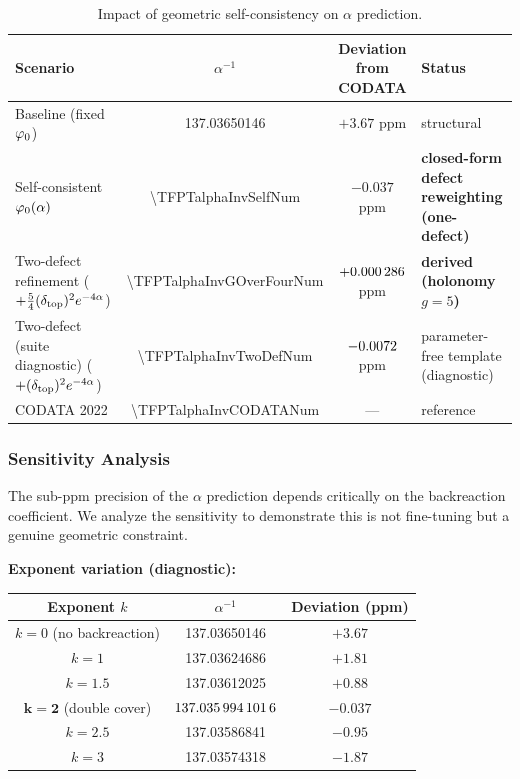 \begin{table}[H]
\centering
\small
\setlength{\tabcolsep}{4pt}
\begin{tabularx}{\linewidth}{@{}lccX@{}}
\toprule
\textbf{Scenario} & $\alpha^{-1}$ & \textbf{Deviation from CODATA} & \textbf{Status}\\
\midrule
Baseline (fixed $\varphi_0$) & 137.03650146 & $+3.67$ ppm & structural\\
Self-consistent $\varphi_0(\alpha)$ & \num[round-mode=places,round-precision=10]{\TFPTalphaInvSelfNum} & $-0.037$ ppm & \textbf{closed-form defect reweighting (one-defect)}\\
Two-defect refinement ($+\tfrac54(\delta_{\mathrm{top}})^2 e^{-4\alpha}$) & \num[round-mode=places,round-precision=12]{\TFPTalphaInvGOverFourNum} & $+\num[round-mode=places,round-precision=6]{\TFPTalphaPpmGOverFourNum}$ ppm & \textbf{derived (holonomy $g=5$)}\\
Two-defect (suite diagnostic) ($+(\delta_{\mathrm{top}})^2 e^{-4\alpha}$) & \num[round-mode=places,round-precision=10]{\TFPTalphaInvTwoDefNum} & $\num[round-mode=places,round-precision=4]{\TFPTalphaPpmTwoDefNum}$ ppm & parameter-free template (diagnostic)\\
CODATA 2022 & \num[round-mode=places,round-precision=9]{\TFPTalphaInvCODATANum} & --- & reference\\
\bottomrule
\end{tabularx}
\caption{Impact of geometric self-consistency on $\alpha$ prediction.}
\label{tab:alpha}
\end{table}

\TFPTAlphaAuditTable

\subsubsection{Sensitivity Analysis}
\label{sec:sensitivity}

The sub-ppm precision of the $\alpha$ prediction depends critically on the backreaction 
coefficient. We analyze the sensitivity to demonstrate this is not fine-tuning but 
a genuine geometric constraint.

\textbf{Exponent variation (diagnostic):}
\begin{center}
\begin{tabular}{@{}ccc@{}}
\toprule
\textbf{Exponent $k$} & $\alpha^{-1}$ & \textbf{Deviation (ppm)}\\
\midrule
$k = 0$ (no backreaction) & 137.03650146 & $+3.67$\\
$k = 1$ & 137.03624686 & $+1.81$\\
$k = 1.5$ & 137.03612025 & $+0.88$\\
$\mathbf{k = 2}$ (double cover) & $\mathbf{\num[round-mode=places,round-precision=10]{\TFPTalphaInvSelfNum}}$ & $\mathbf{-0.037}$\\
$k = 2.5$ & 137.03586841 & $-0.95$\\
$k = 3$ & 137.03574318 & $-1.87$\\
\bottomrule
\end{tabular}
\end{center}

